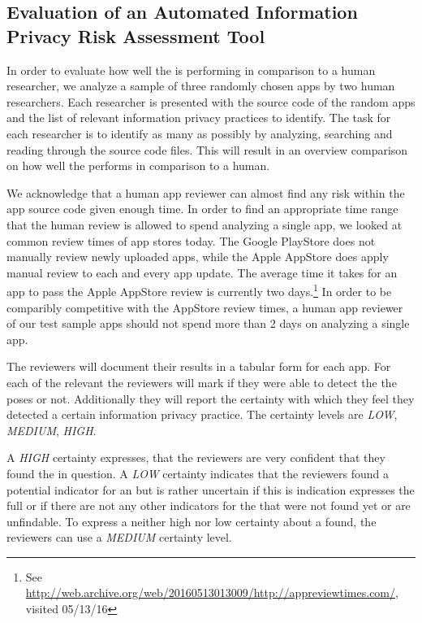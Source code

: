 
\subsection{Evaluation of an Automated Information Privacy Risk Assessment Tool}

In order to evaluate how well the \aiprat is performing in comparison to a human researcher, we analyze a sample of three randomly chosen apps by two human researchers.
Each researcher is presented with the source code of the random apps and the list of relevant information privacy practices to identify.
The task for each researcher is to identify as many \ipp as possibly by analyzing, searching and reading through the source code files. 
This will result in an overview comparison on how well the \aiprat performs in comparison to a human.

We acknowledge that a human app reviewer can almost find any \ipp risk within the app source code given enough time.
In order to find an appropriate time range that the human review is allowed to spend analyzing a single app, we looked at common review times of app stores today.
The Google PlayStore does not manually review newly uploaded apps, while the Apple AppStore does apply manual review to each and every app update.
The average time it takes for an app to pass the Apple AppStore review  is currently two days.\footnote{See \url{http://web.archive.org/web/20160513013009/http://appreviewtimes.com/}, visited 05/13/16}
In order to be comparibly competitive with the AppStore review times, a human app reviewer of our test sample apps should not spend more than 2 days on analyzing a single app.

The reviewers will document their results in a tabular form for each app.
For each of the relevant \ipp the reviewers will mark if they were able to detect the \ipr the \ipp poses or not.
Additionally they will report the certainty with which they feel they detected a certain information privacy practice.
The certainty levels are \textit{LOW}, \textit{MEDIUM}, \textit{HIGH}.

A \textit{HIGH} certainty expresses, that the reviewers are very confident that they found the \ipp in question.
A \textit{LOW} certainty indicates that the reviewers found a potential indicator for an \ipp but is rather uncertain if this is indication expresses the full \ipp or if there are not any other indicators for the \ipp that were not found yet or are unfindable.
To express a neither high nor low certainty about a \ipp found, the reviewers can use a \textit{MEDIUM} certainty level.